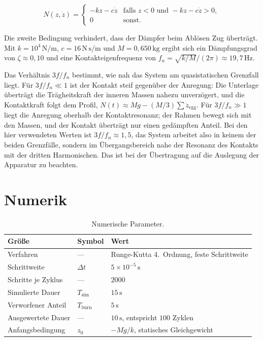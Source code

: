 \documentclass[12pt,a4paper]{report}
\begin{document}
\begin{equation}
N(z, \dot{z}) =
\begin{cases}
-k z - c \dot{z} & \text{falls } z < 0 \text{ und } -k z - c \dot{z} > 0,\\
0 & \text{sonst.}
\end{cases}
\label{eq:kontakt}
\end{equation}

Die zweite Bedingung verhindert, dass der Dämpfer beim Ablösen Zug
überträgt. Mit $k = 10^{4}\,\mathrm{N/m}$, $c = 16\,\mathrm{N\,s/m}$ und
$M = 0{,}650\,\mathrm{kg}$ ergibt sich ein Dämpfungsgrad von
$\zeta \approx 0{,}10$ und eine Kontakteigenfrequenz von
$f_n = \sqrt{k/M}/(2\pi) \approx 19{,}7\,\mathrm{Hz}$.

Das Verhältnis $3f/f_n$ bestimmt, wie nah das System am quasistatischen
Grenzfall liegt. Für $3f/f_n \ll 1$ ist der Kontakt steif gegenüber der
Anregung: Die Unterlage überträgt die Trägheitskraft der inneren Massen
nahezu unverzögert, und die Kontaktkraft folgt dem Profil,
$N(t) \approx Mg - (M/3)\sum \ddot{z}_{\mathrm{egg}}$. Für
$3f/f_n \gg 1$ liegt die Anregung oberhalb der Kontaktresonanz; der
Rahmen bewegt sich mit den Massen, und der Kontakt überträgt nur einen
gedämpften Anteil. Bei den hier verwendeten Werten ist
$3f/f_n \approx 1{,}5$, das System arbeitet also in keinem der beiden
Grenzfälle, sondern im Übergangsbereich nahe der Resonanz des
Kontakts mit der dritten Harmonischen. Das ist bei der Übertragung auf die Auslegung
der Apparatur zu beachten.

\section{Numerik}
\label{sec:anh-numerik}

\begin{table}[htbp]
  \centering
  \begin{tabular}{lll}
    \hline
    Größe & Symbol & Wert \\
    \hline
    Verfahren           & ---                & Runge-Kutta 4.~Ordnung, feste Schrittweite \\
    Schrittweite        & $\Delta t$         & $5 \times 10^{-5}\,\mathrm{s}$ \\
    Schritte je Zyklus  & ---                & $2000$ \\
    Simulierte Dauer    & $T_{\mathrm{sim}}$ & $15\,\mathrm{s}$ \\
    Verworfener Anteil  & $T_{\mathrm{burn}}$& $5\,\mathrm{s}$ \\
    Ausgewertete Dauer  & ---                & $10\,\mathrm{s}$, entspricht $100$ Zyklen \\
    Anfangsbedingung    & $z_0$              & $-Mg/k$, statisches Gleichgewicht \\
    \hline
  \end{tabular}
  \caption{Numerische Parameter.}
  \label{tab:numerik}
\end{table}
\end{document}
